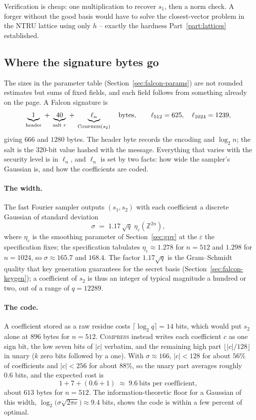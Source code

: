 Verification is cheap: one multiplication to recover $s_1$, then a norm check. A forger without the good basis would have to solve the closest-vector problem in the NTRU lattice using only $h$ -- exactly the hardness Part~\ref{part:lattices} established.

\subsection{Where the signature bytes go}
\label{sec:falcon-sizes}

The sizes in the parameter table (Section~\ref{sec:falcon-params}) are not rounded estimates but sums of fixed fields, and each field follows from something already on the page. A Falcon signature is
\[
\underbrace{1}_{\text{header}} \;+\; \underbrace{40}_{\text{salt }r} \;+\; \underbrace{\ell_n}_{\textsc{Compress}(s_2)} \quad\text{bytes},
\qquad \ell_{512}=625,\quad \ell_{1024}=1239,
\]
giving $666$ and $1280$ bytes. The header byte records the encoding and $\log_2 n$; the salt is the 320-bit value hashed with the message. Everything that varies with the security level is in $\ell_n$, and $\ell_n$ is set by two facts: how wide the sampler's Gaussian is, and how the coefficients are coded.

\paragraph{The width.} The fast Fourier sampler outputs $(s_1,s_2)$ with each coefficient a discrete Gaussian of standard deviation
\[
\sigma \;=\; 1.17\,\sqrt{q}\;\eta_\varepsilon(\mathbb{Z}^{2n}),
\]
where $\eta_\varepsilon$ is the smoothing parameter of Section~\ref{sec:gpv} at the $\varepsilon$ the specification fixes; the specification tabulates $\eta_\varepsilon \approx 1.278$ for $n=512$ and $1.298$ for $n=1024$, so $\sigma \approx 165.7$ and $168.4$. The factor $1.17\sqrt{q}$ is the Gram--Schmidt quality that key generation guarantees for the secret basis (Section~\ref{sec:falcon-keygen}); a coefficient of $s_2$ is thus an integer of typical magnitude a hundred or two, out of a range of $q=12289$.

\paragraph{The code.} A coefficient stored as a raw residue costs $\lceil\log_2 q\rceil = 14$ bits, which would put $s_2$ alone at $896$ bytes for $n=512$. \textsc{Compress} instead writes each coefficient $c$ as one sign bit, the low seven bits of $|c|$ verbatim, and the remaining high part $\lfloor |c|/128\rfloor$ in unary ($k$ zero bits followed by a one). With $\sigma\approx166$, $|c|<128$ for about $56\%$ of coefficients and $|c|<256$ for about $88\%$, so the unary part averages roughly $0.6$ bits, and the expected cost is
\[
1 + 7 + (0.6 + 1) \;\approx\; 9.6\ \text{bits per coefficient},
\]
about $613$ bytes for $n=512$. The information-theoretic floor for a Gaussian of this width, $\log_2\bigl(\sigma\sqrt{2\pi e}\bigr)\approx 9.4$ bits, shows the code is within a few percent of optimal.

